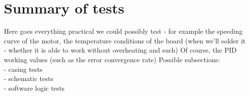 \section{Summary of tests}

Here goes everything practical we could possibly test - for example the speeding curve of the motor, the temperature conditions of the board (when we'll solder it - whether it is able to work without overheating and such) 
Of course, the PID working values (such as the error convergence rate)
Possible subsections:\\
    - casing tests \\
    - schematic tests \\
    - software logic tests \\


